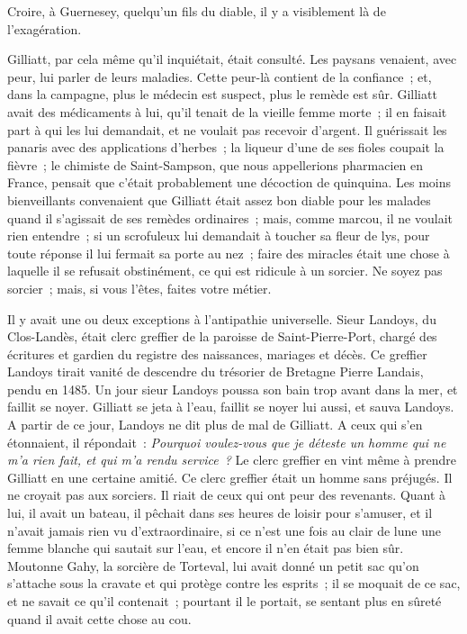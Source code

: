 \documentclass[french,twoside]{book} %
\begin{document}
Croire, à Guernesey, quelqu’un fils du diable, il y a visiblement là de l’exagération.\par
Gilliatt, par cela même qu’il inquiétait, était consulté. Les paysans venaient, avec peur, lui parler de leurs maladies. Cette peur-là contient de la confiance ; et, dans la campagne, plus le médecin est suspect, plus le remède est sûr. Gilliatt avait des médicaments  à lui, qu’il tenait de la vieille femme morte ; il en faisait part à qui les lui demandait, et ne voulait pas recevoir d’argent. Il guérissait les panaris avec des applications d’herbes ; la liqueur d’une de ses fioles coupait la fièvre ; le chimiste de Saint-Sampson, que nous appellerions pharmacien en France, pensait que c’était probablement une décoction de quinquina. Les moins bienveillants convenaient que Gilliatt était assez bon diable pour les malades quand il s’agissait de ses remèdes ordinaires ; mais, comme marcou, il ne voulait rien entendre ; si un scrofuleux lui demandait à toucher sa fleur de lys, pour toute réponse il lui fermait sa porte au nez ; faire des miracles était une chose à laquelle il se refusait obstinément, ce qui est ridicule à un sorcier. Ne soyez pas sorcier ; mais, si vous l’êtes, faites votre métier.\par
Il y avait une ou deux exceptions à l’antipathie universelle. Sieur Landoys, du Clos-Landès, était clerc greffier de la paroisse de Saint-Pierre-Port, chargé des écritures et gardien du registre des naissances, mariages et décès. Ce greffier Landoys tirait vanité de descendre du trésorier de Bretagne Pierre Landais, pendu en 1485. Un jour sieur Landoys poussa son bain trop avant dans la mer, et faillit se noyer. Gilliatt se jeta à l’eau, faillit se noyer lui aussi, et sauva Landoys. A partir de ce jour, Landoys ne dit plus de mal de Gilliatt. A ceux qui s’en étonnaient, il répondait : \emph{Pourquoi voulez-vous que je déteste un homme qui ne m’a rien fait, et qui m’a rendu service ?} Le clerc greffier en vint même à prendre Gilliatt en une certaine amitié. Ce  clerc greffier était un homme sans préjugés. Il ne croyait pas aux sorciers. Il riait de ceux qui ont peur des revenants. Quant à lui, il avait un bateau, il pêchait dans ses heures de loisir pour s’amuser, et il n’avait jamais rien vu d’extraordinaire, si ce n’est une fois au clair de lune une femme blanche qui sautait sur l’eau, et encore il n’en était pas bien sûr. Moutonne Gahy, la sorcière de Torteval, lui avait donné un petit sac qu’on s’attache sous la cravate et qui protège contre les esprits ; il se moquait de ce sac, et ne savait ce qu’il contenait ; pourtant il le portait, se sentant plus en sûreté quand il avait cette chose au cou.\par
\end{document}
